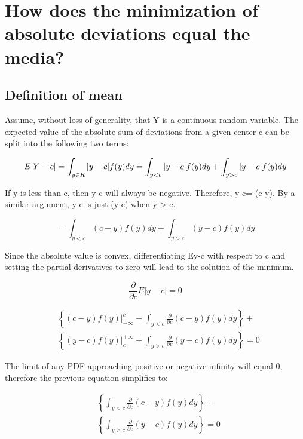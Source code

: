 \documentclass[
  letterpaper,
  DIV=11,
  numbers=noendperiod]{scrreprt}
\begin{document}
\hypertarget{how-does-the-minimization-of-absolute-deviations-equal-the-media}{%
\section{How does the minimization of absolute deviations equal the
media?}\label{how-does-the-minimization-of-absolute-deviations-equal-the-media}}

\hypertarget{definition-of-mean}{%
\subsection{Definition of mean}\label{definition-of-mean}}

Assume, without loss of generality, that Y is a continuous random
variable. The expected value of the absolute sum of deviations from a
given center c can be split into the following two terms:

\[
E|Y - c| = \int_{y\in R}|y-c|f(y)dy \\
=\int_{y < c} |y-c|f(y)dy + \int_{y>c}|y-c|f(y)dy  \\
\]

If y is less than c, then y-c will always be negative. Therefore,
\textbar y-c\textbar=-(c-y). By a similar argument,
\textbar y-c\textbar{} is just (y-c) when y \textgreater{} c.~

\[
=\int_{y<c}(c-y)f(y)dy + \int_{y>c}(y-c)f(y)dy
\]

Since the absolute value is convex, differentiating
E\textbar y-c\textbar{} with respect to c and setting the partial
derivatives to zero will lead to the solution of the minimum.

\[
\frac{\partial}{\partial c}E|y-c|=0
\]

\[
\begin{aligned}
& \left\{\left.(c-y) f(y)\right|_{-\infty} ^c+\int_{y<c} \frac{\partial}{\partial c}(c-y) f(y) d y\right\}+ \\
& \left\{\left.(y-c) f(y)\right|_c ^{+\infty}+\int_{y>c} \frac{\partial}{\partial c}(y-c) f(y) d y\right\}=0
\end{aligned}
\]

The limit of any PDF approaching positive or negative infinity will
equal 0, therefore the previous equation simplifies to:

\[
\begin{aligned}
& \left\{\int_{y<c} \frac{\partial}{\partial c}(c-y) f(y) d y\right\}+ \\
& \left\{\int_{y>c} \frac{\partial}{\partial c}(y-c) f(y) d y\right\}=0
\end{aligned}
\]
\end{document}
